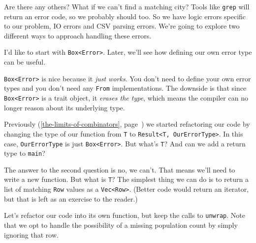 \documentclass[a4paper,]{book}
\renewcommand*{\hyperref}[2][\ar]{%
  \def\ar{#2}%
  #2 (\autoref{#1}, page~\pageref{#1})}
\begin{document}
Are there any others? What if we can't find a matching city? Tools like
\texttt{grep} will return an error code, so we probably should too. So
we have logic errors specific to our problem, IO errors and CSV parsing
errors. We're going to explore two different ways to approach handling
these errors.

I'd like to start with \texttt{Box\textless{}Error\textgreater{}}.
Later, we'll see how defining our own error type can be useful.


\texttt{Box\textless{}Error\textgreater{}} is nice because it \emph{just
works}. You don't need to define your own error types and you don't need
any \texttt{From} implementations. The downside is that since
\texttt{Box\textless{}Error\textgreater{}} is a trait object, it
\emph{erases the type}, which means the compiler can no longer reason
about its underlying type.

\hyperref[the-limits-of-combinators]{Previously} we started refactoring
our code by changing the type of our function from \texttt{T} to
\texttt{Result\textless{}T,\ OurErrorType\textgreater{}}. In this case,
\texttt{OurErrorType} is just
\texttt{Box\textless{}Error\textgreater{}}. But what's \texttt{T}? And
can we add a return type to \texttt{main}?

The answer to the second question is no, we can't. That means we'll need
to write a new function. But what is \texttt{T}? The simplest thing we
can do is to return a list of matching \texttt{Row} values as a
\texttt{Vec\textless{}Row\textgreater{}}. (Better code would return an
iterator, but that is left as an exercise to the reader.)

Let's refactor our code into its own function, but keep the calls to
\texttt{unwrap}. Note that we opt to handle the possibility of a missing
population count by simply ignoring that row.
\end{document}
